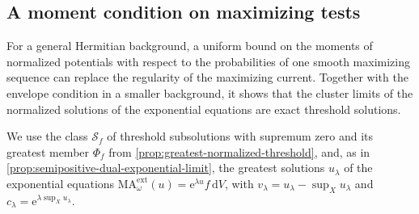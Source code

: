 \subsection{A moment condition on maximizing tests}

For a general Hermitian background, a uniform bound on the moments of normalized potentials with respect to the probabilities of one smooth maximizing sequence can replace the regularity of the maximizing current. Together with the envelope condition in a smaller background, it shows that the cluster limits of the normalized solutions of the exponential equations are exact threshold solutions.

We use the class $\mathcal S_f$ of threshold subsolutions with supremum zero and its greatest member $\Phi_f$ from \cref{prop:greatest-normalized-threshold}, and, as in \cref{prop:semipositive-dual-exponential-limit}, the greatest solutions $u_\lambda$ of the exponential equations $\mathrm{MA}^{\mathrm{ext}}_\omega(u)=\mathrm{e}^{\lambda u}f\,\mathrm{d}V$, with $v_\lambda=u_\lambda-\sup_Xu_\lambda$ and $c_\lambda=\mathrm{e}^{\lambda\sup_Xu_\lambda}$.

